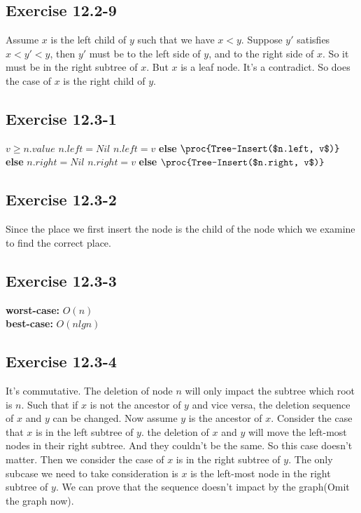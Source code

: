 \documentclass[12pt]{article}
\theoremstyle{definition}
\theoremstyle{remark}
\begin{document}
\subsection*{Exercise 12.2-9}
Assume $x$ is the left child of $y$ such that we have $x<y$. Suppose $y'$ satisfies $x<y'<y$, then $y'$ must be to the left side of $y$, and to the right side of $x$. So it must be in the right subtree of $x$. But $x$ is a leaf node. It's a contradict. So does the case of $x$ is the right child of $y$.
\subsection*{Exercise 12.3-1}
\begin{codebox}
\li \If $v\ge n.value$ \label{li:if}
\li \quad \If $n.left=Nil$ \label{li:if}
\li \qquad $n.left=v$
\li \quad \textbf{else}
\li \qquad $\proc{Tree-Insert($n.left, v$)}$
\li \textbf{else}
\li \quad \If $n.right=Nil$ \label{li:if}
\li \qquad $n.right=v$
\li \quad \textbf{else}
\li \qquad $\proc{Tree-Insert($n.right, v$)}$
\end{codebox}
\subsection*{Exercise 12.3-2}
Since the place we first insert the node is the child of the node which we examine to find the correct place.
\subsection*{Exercise 12.3-3}
\textbf{worst-case:} $O(n)$\\
\textbf{best-case:} $O(nlgn)$
\subsection*{Exercise 12.3-4}
It's commutative. The deletion of node $n$ will only impact the subtree which root is $n$. Such that if $x$ is not the ancestor of $y$ and vice versa, the deletion sequence of $x$ and $y$ can be changed. Now assume $y$ is the ancestor of $x$. Consider the case that $x$ is in the left subtree of $y$. the deletion of $x$ and $y$ will move the left-most nodes in their right subtree. And they couldn't be the same. So this case doesn't matter. Then we consider the case of $x$ is in the right subtree of $y$. The only subcase we need to take consideration is $x$ is the left-most node in the right subtree of $y$. We can prove that the sequence doesn't impact by the graph(Omit the graph now).
\end{document}
